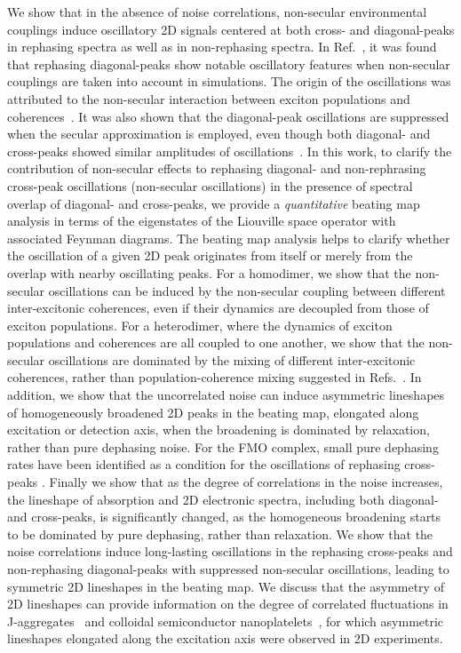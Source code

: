 \documentclass[%
 reprint,%
 amssymb, amsmath,%
 aip,cha,%
]{revtex4-1}
\begin{document}
We show that in the absence of noise correlations, non-secular environmental couplings induce oscillatory 2D signals centered at both cross- and diagonal-peaks in rephasing spectra as well as in non-rephasing spectra. In Ref.~, it was found that rephasing diagonal-peaks show notable oscillatory features when non-secular couplings are taken into account in simulations. The origin of the oscillations was attributed to the non-secular interaction between exciton populations and coherences~\cite{AbramaviciusJCP2010,PanitchayangkoonPNAS2011}. It was also shown that the diagonal-peak oscillations are suppressed when the secular approximation is employed, even though both diagonal- and cross-peaks showed similar amplitudes of oscillations~\cite{AbramaviciusJCP2010}. In this work, to clarify the contribution of non-secular effects to rephasing diagonal- and non-rephrasing cross-peak oscillations (non-secular oscillations) in the presence of spectral overlap of diagonal- and cross-peaks, we provide a {\it quantitative} beating map analysis in terms of the eigenstates of the Liouville space operator with associated Feynman diagrams. The beating map analysis helps to clarify whether the oscillation of a given 2D peak originates from itself or merely from the overlap with nearby oscillating peaks. For a homodimer, we show that the non-secular oscillations can be induced by the non-secular coupling between different inter-excitonic coherences, even if their dynamics are decoupled from those of exciton populations. For a heterodimer, where the dynamics of exciton populations and coherences are all coupled to one another, we show that the non-secular oscillations are dominated by the mixing of different inter-excitonic coherences, rather than population-coherence mixing suggested in Refs.~. In addition, we show that the uncorrelated noise can induce asymmetric lineshapes of homogeneously broadened 2D peaks in the beating map, elongated along excitation or detection axis, when the broadening is dominated by relaxation, rather than pure dephasing noise. For the FMO complex, small pure dephasing rates have been identified as a condition for the oscillations of rephasing cross-peaks \cite{KreisbeckJPCL2012}. Finally we show that as the degree of correlations in the noise increases, the lineshape of absorption and 2D electronic spectra, including both diagonal- and cross-peaks, is significantly changed, as the homogeneous broadening starts to be dominated by pure dephasing, rather than relaxation. We show that the noise correlations induce long-lasting oscillations in the rephasing cross-peaks and non-rephasing diagonal-peaks with suppressed non-secular oscillations, leading to symmetric 2D lineshapes in the beating map. We discuss that the asymmetry of 2D lineshapes can provide information on the degree of correlated fluctuations in J-aggregates~\cite{LimNC2015} and colloidal semiconductor nanoplatelets~\cite{CassetteNC2015}, for which asymmetric lineshapes elongated along the excitation axis were observed in 2D experiments.
\end{document}
